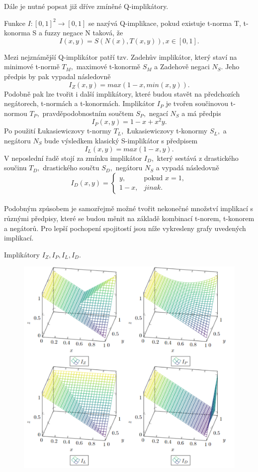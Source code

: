 Dále je nutné popsat již dříve zmíněné Q-implikátory.
\begin{definition}
    \cite{Springer}
    Funkce $I: [0,1]^2 \rightarrow [0,1]$ se nazývá Q-implikace, pokud existuje t-norma T, t-konorma S a fuzzy negace N taková, že $$I(x,y) = S(N(x),T(x,y)), x \in [0,1].$$
\end{definition}
Mezi nejznámější Q-implikátor patří tzv. Zadeh\r uv implikátor, který staví na minimové t-normě $T_M,$ maximové t-konormě $S_M$ a Zadehově negaci $N_S$. Jeho předpis by pak vypadal následovně $$I_Z(x,y) = max(1-x, min(x,y)).$$ Podobně pak lze tvořit i další implikátory, které budou stavět na předchozích negátorech, t-normách a t-konormách. Implikátor $I_P$ je tvořen součinovou t-normou $T_P,$ pravděpodobnostním součtem $S_P,$ negací $N_S$ a má předpis $$I_P(x,y) = 1-x+x^2y.$$  Po použití Łukasiewiczovy t-normy $T_L,$ Łukasiewiczovy t-konormy $S_L,$ a negátoru $N_S$ bude výsledkem klasický S-implikátor s předpisem $$I_L(x,y) = max(1-x, y).$$ V neposlední řadě stojí za zmínku implikátor $I_D,$ který sestává z drastického součinu $T_D,$ drastického součtu $S_D,$ negátoru $N_S$ a vypadá následovně $$I_D(x,y) = \begin{cases}  y, & \mbox{pokud } x = 1,\\
                1 - x, &  jinak.  \end{cases}$$\\ 
Podobným zp\r usobem je samozřejmě možné tvořit nekonečné množství implikací s r\r uznými předpisy, které se budou měnit na základě kombinací t-norem, t-konorem a negátor\r u. Pro lepší pochopení spojitostí jsou níže vykresleny grafy uvedených implikací.
\begin{graph}Implikátory $I_Z, I_P, I_L, I_D.$
\begin{figure}[H]
                \hspace{-1cm}
                \includegraphics[scale=0.7]{template-fig/impl3.pdf}
                \centering
            \end{figure}
    
\end{graph}


